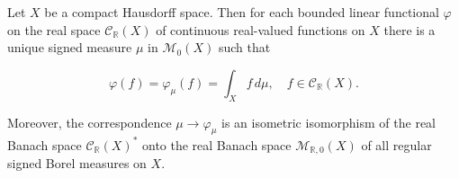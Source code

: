Let $X$ be a compact Hausdorff space. Then for each bounded linear functional $\varphi$ on the real space $\mathcal{C}_{\mathbb{R}}(X)$ of continuous real-valued functions on $X$ there is a unique signed measure $\mu$ in $\mathcal{M}_0(X)$ such that

$$\varphi(f) = \varphi_\mu(f) = \int_X f \, d\mu, \quad f \in \mathcal{C}_{\mathbb{R}}(X).$$

Moreover, the correspondence $\mu \rightarrow \varphi_\mu$ is an isometric isomorphism of the real Banach space $\mathcal{C}_{\mathbb{R}}(X)^*$ onto the real Banach space $\mathcal{M}_{\mathbb{R},0}(X)$ of all regular signed Borel measures on $X$.
